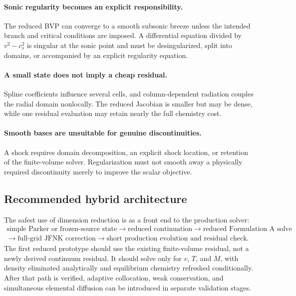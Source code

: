 \documentclass[english,a4paper]{my_memo}
\newcommand{\mdot}{\dot M}
\begin{document}
\paragraph{Sonic regularity becomes an explicit responsibility.}
The reduced BVP can converge to a smooth subsonic breeze unless the intended
branch and critical conditions are imposed.  A differential equation divided by
\(v^2-c_s^2\) is singular at the sonic point and must be desingularized, split
into domains, or accompanied by an explicit regularity equation.

\paragraph{A small state does not imply a cheap residual.}
Spline coefficients influence several cells, and column-dependent radiation
couples the radial domain nonlocally.  The reduced Jacobian is smaller but may be
dense, while one residual evaluation may retain nearly the full chemistry cost.

\paragraph{Smooth bases are unsuitable for genuine discontinuities.}
A shock requires domain decomposition, an explicit shock location, or retention
of the finite-volume solver.  Regularization must not smooth away a physically
required discontinuity merely to improve the scalar objective.

\subsection{Recommended hybrid architecture}

The safest use of dimension reduction is as a front end to the production
solver:
\begin{equation}
 \begin{gathered}
  \text{simple Parker or frozen-source state}
  \longrightarrow \text{reduced continuation}
  \longrightarrow \text{reduced Formulation A solve} \\
  \longrightarrow \text{full-grid JFNK correction}
  \longrightarrow \text{short production evolution and residual check}.
 \end{gathered}
 \label{eq:hybridworkflow}
\end{equation}
The first reduced prototype should use the existing finite-volume residual, not
a newly derived continuum residual.  It should solve only for \(v\), \(T\), and
\(\mdot\), with density eliminated analytically and equilibrium chemistry
refreshed conditionally.  After that path is verified, adaptive collocation,
weak conservation, and simultaneous elemental diffusion can be introduced in
separate validation stages.
\end{document}
